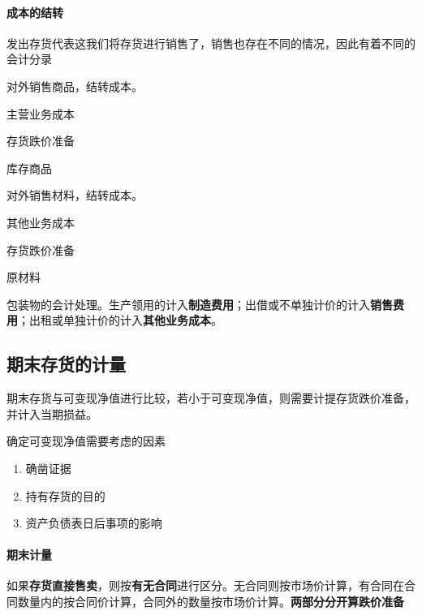 \documentclass[UTF8,12pt]{ctexart}
\newenvironment{Dr}{%
	\begin{list}{}%
		{
			\setlength{\leftmargin}{2em}
			\setlength{\labelwidth}{2em}
			\setlength{\labelsep}{0pt}
			\setlength{\itemindent}{0pt}
			\setlength{\listparindent}{0pt}
			\setlength{\parsep}{0pt}
			\setlength{\topsep}{0pt}
		}
		\item[\textbf{借：}]
	}{%
	\end{list}
}
\newenvironment{Cr}{%
	\begin{list}{}%
		{
			\setlength{\leftmargin}{3em}
			\setlength{\labelwidth}{2em}
			\setlength{\labelsep}{0pt}
			\setlength{\itemindent}{0pt}
			\setlength{\listparindent}{0pt}
			\setlength{\parsep}{0pt}
			\setlength{\topsep}{0pt}
		}
		\item[\textbf{贷：}]
	}{%
	\end{list}
}
\numberwithin{equation}{section} %
\numberwithin{figure}{section}
\numberwithin{table}{section}
\begin{document}
	\paragraph{成本的结转} 发出存货代表这我们将存货进行销售了，销售也存在不同的情况，因此有着不同的会计分录
	\begin{enumerate}
		\item 对外销售商品，结转成本。
		
		\begin{Dr}
			主营业务成本
			
			存货跌价准备
		\end{Dr}
		\begin{Cr}
			库存商品
		\end{Cr}
		
		\item 对外销售材料，结转成本。
		
		\begin{Dr}
			其他业务成本
			
			存货跌价准备
		\end{Dr}
		\begin{Cr}
			原材料
		\end{Cr}
		
		\item 包装物的会计处理。生产领用的计入\textbf{制造费用}；出借或不单独计价的计入\textbf{销售费用}；出租或单独计价的计入\textbf{其他业务成本}。
	\end{enumerate}
	
	\subsection{期末存货的计量}
	期末存货与可变现净值进行比较，若小于可变现净值，则需要计提存货跌价准备，并计入当期损益。
	
	确定可变现净值需要考虑的因素
	\begin{enumerate}
		\item 确凿证据
		
		\item 持有存货的目的
		
		\item 资产负债表日后事项的影响
	\end{enumerate}
	
	\paragraph{期末计量}
	如果\textbf{存货直接售卖}，则按\textbf{有无合同}进行区分。无合同则按市场价计算，有合同在合同数量内的按合同价计算，合同外的数量按市场价计算。\textbf{两部分分开算跌价准备}
	
\end{document}
